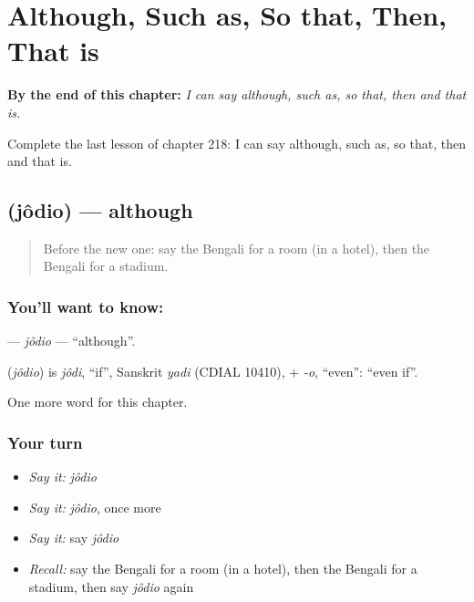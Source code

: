 
\chapter{Although, Such as, So that, Then, That is}
\label{ch:bn-although-such-as-so-that-then-that-is}

\begin{chapteropening}
\textbf{By the end of this chapter:} \emph{I can say although, such as, so that, then and that is.}

Complete the last lesson of chapter 218: I can say although, such as, so that, then and that is.
\end{chapteropening}

\section[\texorpdfstring{\bn{যদিও} (jôdio)}{যদিও (jôdio)}]{ (jôdio) — although}

\label{lesson:BN-C218-jodio}



\begin{quote}
Before the new one: say the Bengali for a room (in a hotel), then the Bengali for a stadium.
\end{quote}

\subsection*{You'll want to know: }
\textbf{} — \emph{jôdio} — \textquotedblleft{}although\textquotedblright{}.

\begin{cousinweb}
\textbf{} (\emph{jôdio}) is \emph{jôdi}, \textquotedblleft{}if\textquotedblright{}, Sanskrit \emph{yadi} (CDIAL 10410), + \emph{-o}, \textquotedblleft{}even\textquotedblright{}: \textquotedblleft{}even if\textquotedblright{}.
\end{cousinweb}

\begin{grammarlens}[title={What you've built}]
One more word for this chapter.
\end{grammarlens}

\subsection*{Your turn}
\begin{itemize}
\raggedright
  \item \emph{Say it:} \emph{jôdio}
  \item \emph{Say it:} \emph{jôdio}, once more
  \item \emph{Say it:} say \emph{jôdio}
  \item \emph{Recall:} say the Bengali for a room (in a hotel), then the Bengali for a stadium, then say \emph{jôdio} again
\end{itemize}


